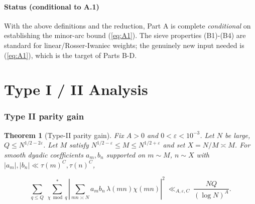 \documentclass[11pt]{article}
\def\eqref#1{(\ref{#1})}%
\newtheorem{theorem}[lemma]{Theorem}
\theoremstyle{definition}
\theoremstyle{remark}
\numberwithin{equation}{part}
\begin{document}
\subsection{Status (conditional to A.1)}
With the above definitions and the reduction, Part A is complete \emph{conditional} on establishing the minor-arc bound \eqref{eq:A1}. The sieve properties (B1)-(B4) are standard for linear/Rosser-Iwaniec weights; the genuinely new input needed is \eqref{eq:A1}, which is the target of Parts B-D.

\part{Type I / II Analysis}

\section{Type II parity gain}

\begin{theorem}[Type-II parity gain]
	Fix $A>0$ and $0<\varepsilon<10^{-3}$. Let $N$ be large, $Q\le N^{1/2-2\varepsilon}$. Let $M$ satisfy $N^{1/2-\varepsilon}\le M\le N^{1/2+\varepsilon}$ and set $X=N/M\asymp M$. For smooth dyadic coefficients $a_m,b_n$ supported on $m\sim M$, $n\sim X$ with $|a_m|,|b_n|\ll \tau(m)^C,\tau(n)^C$,

	$$
		\sum_{q\le Q}\ \sum_{\chi\bmod q}^{\!*}
		\left|\sum_{mn\asymp N} a_m b_n\,\lambda(mn)\chi(mn)\right|^2
		\ \ll_{A,\varepsilon,C}\ \frac{NQ}{(\log N)^{A}}.
	$$
\end{theorem}
\end{document}
